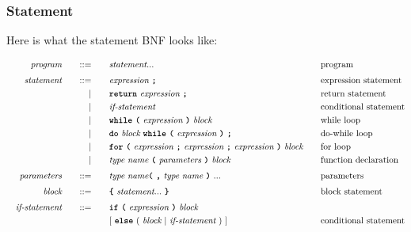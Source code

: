 \documentclass[a4paper]{article}
\begin{document}
\subsubsection{Statement}

Here is what the statement BNF looks like:

\addtolength{\jot}{-0.5mm}
\begin{alignat*}{9}
    && \textit{program}    &&\quad ::= &\quad && \textit{statement} ... && \textrm{program} \\[1mm]
    && \textit{statement}  &&\quad ::= &\quad && \textit{expression} \ \textbf{\texttt{;}} && \textrm{expression statement} \\
	&&                       && |   &\quad && \textbf{\texttt{return}}\  \textit{expression} \ \textbf{\texttt{;}} && \textrm{return statement}\\
	&&                       && |   &\quad && \textit{if-statement} \quad && \textrm{conditional statement}\\
	&&                       && |   &\quad && \textbf{\texttt{while}}\  \textbf{\texttt{(}}\  \textit{expression} \ \textbf{\texttt{)}} \ \textit{block} && \textrm{while loop}\\
	&&						 && |	&\quad && \textbf{\texttt{do}} \ \textit{block} \ \textbf{\texttt{while}}\  \textbf{\texttt{(}}\  \textit{expression} \ \textbf{\texttt{)}} \ \textbf{\texttt{;}} && \textrm{do-while loop}\\
	&&						 && | 	 &\quad && \textbf{\texttt{for}}\  \textbf{\texttt{(}}\  \textit{expression} \ \textbf{\texttt{;}} \ \textit{expression} \ \textbf{\texttt{;}} \ \textit{expression} \ \textbf{\texttt{)}} \ \textit{block} \ \ \  && \textrm{for loop}\\
	&&						&& 	| &\quad && \textit{type}\  \textit{name} \ \textbf{\texttt{(}}\  \textit{parameters} \ \textbf{\texttt{)}}\ \textit{block} \quad && \textrm{function declaration}\\[1mm]
	&& \textit{parameters}    &&\quad ::= &\quad && \textit{type}\  \textit{name} \textbf{\texttt{(}}\  \textbf{\texttt{,}}\ \textit{type}\  \textit{name} \ \textbf{\texttt{)}}\ ... && \textrm{parameters} \\[1mm]
	&& \textit{block}         &&\quad ::= &\quad && \textbf{\texttt{\{}}\  \textit{statement} ... \ \textbf{\texttt{\}}} \quad && \textrm{block statement} \\[1mm]
	&& \textit{if-statement} && ::= &\quad &&  \textbf{\texttt{if}}\
                                   \textbf{\texttt{(}}\ \textit{expression} \ \textbf{\texttt{)}}\ 
                                   \textit{block} \\
&&                       &&     &      && [ \ \textbf{\texttt{else}}\
                                          (\ \textit{block}
                                          \ | \
                                          \textit{if-statement} \ )\ ]
                                                            && \textrm{conditional statement} \\[1mm]
\end{alignat*}
\end{document}
